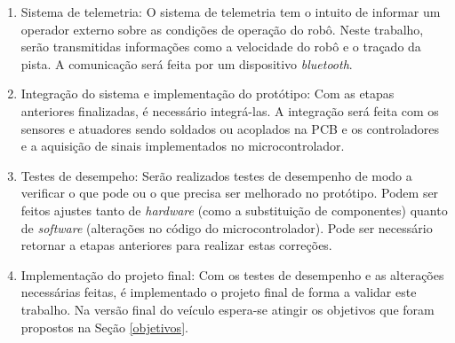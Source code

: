 \begin{enumerate}
 \item Sistema de telemetria: O sistema de telemetria tem o intuito de informar um operador externo sobre as condições de operação do 
 robô. Neste trabalho, serão transmitidas informações como a velocidade do robô e o traçado da pista. A comunicação será feita por um 
 dispositivo \textit{bluetooth}.
 
 \item Integração do sistema e implementação do protótipo: Com as etapas anteriores finalizadas, é necessário integrá-las. 
 A integração será feita com os sensores e atuadores sendo soldados ou acoplados na PCB e os controladores e a aquisição de sinais 
 implementados no microcontrolador. 
 
 \item Testes de desempeho: Serão realizados testes de desempenho de modo a verificar o que pode ou o que precisa ser 
 melhorado no protótipo. Podem ser feitos ajustes tanto de \textit{hardware} 
 (como a substituição de componentes) quanto de \textit{software} (alterações no código do microcontrolador). Pode ser necessário 
 retornar a etapas anteriores para realizar estas correções.
 
 \item Implementação do projeto final: Com os testes de desempenho e as alterações necessárias feitas, é implementado o projeto final de 
 forma a validar este trabalho. Na versão final do veículo espera-se atingir os objetivos que foram propostos na Seção 
 \ref{objetivos}.
 
\end{enumerate}










